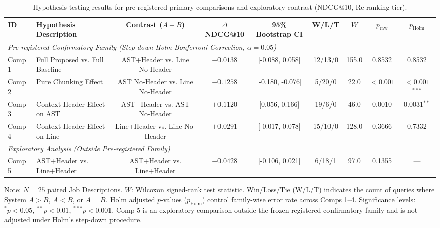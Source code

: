 \begin{table}[t]
\caption{Hypothesis testing results for pre-registered primary comparisons and exploratory contrast (NDCG@10, Re-ranking tier).}
\label{tab:statistical_hypothesis_tests}
\centering\scriptsize
\setlength{\tabcolsep}{2.5pt}
\begin{threeparttable}
\begin{tabular}{@{}llccccccc@{}}
\toprule
ID & Hypothesis Description & Contrast ($A - B$) & $\Delta$ NDCG@10 & 95\% Bootstrap CI & W/L/T & $W$ & $p_{\mathrm{raw}}$ & $p_{\mathrm{Holm}}$ \\
\midrule
\multicolumn{9}{l}{\textit{Pre-registered Confirmatory Family (Step-down Holm-Bonferroni Correction, $\alpha=0.05$)}} \\[2pt]
Comp 1 & Full Proposed vs. Full Baseline & AST+Header vs. Line No-Header & $-0.0138$ & [-0.088, 0.058] & 12/13/0 & 155.0 & 0.8532 & 0.8532 \\
Comp 2 & Pure Chunking Effect & AST No-Header vs. Line No-Header & $-0.1258$ & [-0.180, -0.076] & 5/20/0 & 22.0 & $<0.001$ & $<0.001$$^{***}$ \\
Comp 3 & Context Header Effect on AST & AST+Header vs. AST No-Header & $+0.1120$ & [0.056, 0.166] & 19/6/0 & 46.0 & 0.0010 & 0.0031$^{**}$ \\
Comp 4 & Context Header Effect on Line & Line+Header vs. Line No-Header & $+0.0291$ & [-0.017, 0.078] & 15/10/0 & 128.0 & 0.3666 & 0.7332 \\
\midrule
\multicolumn{9}{l}{\textit{Exploratory Analysis (Outside Pre-registered Family)}} \\[2pt]
Comp 5 & AST+Header vs. Line+Header & AST+Header vs. Line+Header & $-0.0428$ & [-0.106, 0.021] & 6/18/1 & 97.0 & 0.1355 & --- \\
\bottomrule
\end{tabular}
\begin{tablenotes}\footnotesize
\item[] Note: $N=25$ paired Job Descriptions. $W$: Wilcoxon signed-rank test statistic. Win/Loss/Tie (W/L/T) indicates the count of queries where System $A > B$, $A < B$, or $A = B$. Holm adjusted $p$-values ($p_{\mathrm{Holm}}$) control family-wise error rate across Comps 1--4. Significance levels: $^{*}p < 0.05$, $^{**}p < 0.01$, $^{***}p < 0.001$. Comp 5 is an exploratory comparison outside the frozen registered confirmatory family and is not adjusted under Holm's step-down procedure.
\end{tablenotes}
\end{threeparttable}
\end{table}